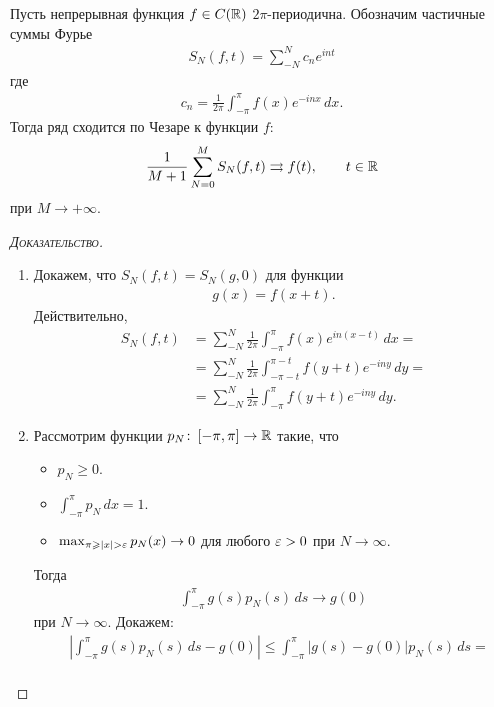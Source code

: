 \documentclass[../complex-analysis.tex]{subfiles}
\begin{document}
\begin{thm}[Фейера]
 Пусть непрерывная функция $ f \in C(\mathbb{R}) $ $ 2\pi $-периодична. Обозначим частичные суммы Фурье
 \begin{align*}
  S_{N} (f,t) = \sum_{-N}^{N} c_ne^{int}
 \end{align*} где
 \begin{align*}
  c_n = \frac{1}{2\pi} \int_{-\pi}^{\pi} f(x)e^{-inx}\,dx.
 \end{align*} Тогда ряд сходится по Чезаре к функции $ f $:
 \begin{align*}
  \frac{1}{M+1} \sum_{N=0}^{M} S_N(f,t) \rightrightarrows f(t), \qquad t \in \mathbb{R}
 \end{align*} при $ M \to + \infty$.
\end{thm}
\begin{proof}[\normalfont\textsc{Доказательство}]\
 \begin{enumerate}
  \item Докажем, что $ S_N(f,t) = S_N(g, 0) $ для функции
    \begin{align*}
    g(x) = f(x + t).
   \end{align*} Действительно,
   \begin{align*}
    S_N(f,t) &= \sum_{-N}^{N} \frac{1}{2\pi} \int_{-\pi}^{\pi} f(x)e^{in(x-t)}\,dx =  \\
    &= \sum_{-N}^{N} \frac{1}{2\pi} \int_{-\pi - t}^{\pi - t} f(y + t)e^{-iny}\,dy = \\
    &= \sum_{-N}^{N}\frac{1}{2\pi} \int_{-\pi}^{\pi} f(y+t)e^{-iny}\,dy.
   \end{align*}
  \item Рассмотрим функции $ p_N \colon\, [-\pi,\pi] \to \mathbb{R} $ такие, что
   \begin{itemize}
    \item $ p_N \geqslant 0 $.
    \item $ \int_{-\pi}^{\pi} p_N\,dx = 1  $.
    \item $ \max_{\pi \geqslant \left| x \right| > \varepsilon} p_N(x) \to 0 $ для любого $ \varepsilon > 0 $ при $ N \to \infty $.
   \end{itemize} Тогда 
   \begin{align*}
    \int_{-\pi}^{\pi} g(s)p_N(s)\,ds \to g(0)
   \end{align*} при $ N \to \infty $. Докажем:
   \begin{align*}
    &\left|\int_{-\pi}^{\pi} g(s)p_N(s)\,ds - g(0) \right| \leqslant \int_{-\pi}^{\pi} \left| g(s) - g(0) \right|p_N(s)\,ds = \\

\end{align*}
\end{enumerate}
\end{proof}
\end{document}
